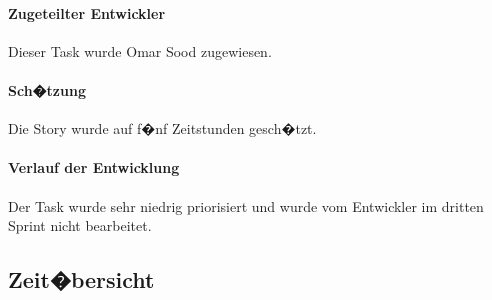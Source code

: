 \documentclass[12pt, titlepage]{scrartcl}
\begin{document}
		\paragraph{Zugeteilter Entwickler} Dieser Task wurde Omar Sood zugewiesen.
		\paragraph{Sch�tzung}
		Die Story wurde auf f�nf Zeitstunden gesch�tzt.
		\paragraph{Verlauf der Entwicklung} 
		Der Task wurde sehr niedrig priorisiert und wurde vom Entwickler im dritten Sprint nicht bearbeitet.
		\newpage
		
		\subsection{Zeit�bersicht}
\end{document}
